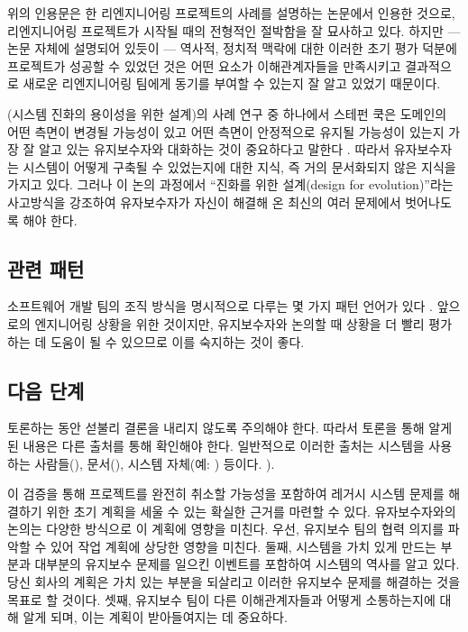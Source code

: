 \documentclass[a4paper,10pt,twoside]{book}
\begin{document}
위의 인용문은 한 리엔지니어링 프로젝트의 사례를 설명하는 논문에서 인용한 것으로, 리엔지니어링 프로젝트가 시작될 때의 전형적인 절박함을 잘 묘사하고 있다. 하지만 --- 논문 자체에 설명되어 있듯이 --- 역사적, 정치적 맥락에 대한 이러한 초기 평가 덕분에 프로젝트가 성공할 수 있었던 것은 어떤 요소가 이해관계자들을 만족시키고 결과적으로 새로운 리엔지니어링 팀에게 동기를 부여할 수 있는지 잘 알고 있었기 때문이다.

(시스템 진화의 용이성을 위한 설계)의 사례 연구 중 하나에서 스테펀 쿡은 도메인의 어떤 측면이 변경될 가능성이 있고 어떤 측면이 안정적으로 유지될 가능성이 있는지 가장 잘 알고 있는 유지보수자와 대화하는 것이 중요하다고 말한다 \cite{Cook01a}. 따라서 유자보수자는 시스템이 어떻게 구축될 수 있었는지에 대한 지식, 즉 거의 문서화되지 않은 지식을 가지고 있다. 그러나 이 논의 과정에서 ``진화를 위한 설계(design for evolution)''라는 사고방식을 강조하여 유자보수자가 자신이 해결해 온 최신의 여러 문제에서 벗어나도록 해야 한다.

\subsection*{관련 패턴}

소프트웨어 개발 팀의 조직 방식을 명시적으로 다루는 몇 가지 패턴 언어가 있다 \cite{Copl95d} \cite{Harri96a} \cite{Tayl00a} \cite{Beed00a}. 앞으로의 엔지니어링 상황을 위한 것이지만, 유지보수자와 논의할 때 상황을 더 빨리 평가하는 데 도움이 될 수 있으므로 이를 숙지하는 것이 좋다.

\subsection*{다음 단계}

토론하는 동안 섣불리 결론을 내리지 않도록 주의해야 한다. 따라서 토론을 통해 알게 된 내용은 다른 출처를 통해 확인해야 한다. 일반적으로 이러한 출처는 시스템을 사용하는 사람들(), 문서(), 시스템 자체(예: ) 등이다. ).

이 검증을 통해 프로젝트를 완전히 취소할 가능성을 포함하여 레거시 시스템 문제를 해결하기 위한 초기 계획을 세울 수 있는 확실한 근거를 마련할 수 있다. 유자보수자와의 논의는 다양한 방식으로 이 계획에 영향을 미친다. 우선, 유지보수 팀의 협력 의지를 파악할 수 있어 작업 계획에 상당한 영향을 미친다. 둘째, 시스템을 가치 있게 만드는 부분과 대부분의 유지보수 문제를 일으킨 이벤트를 포함하여 시스템의 역사를 알고 있다. 당신 회사의 계획은 가치 있는 부분을 되살리고 이러한 유지보수 문제를 해결하는 것을 목표로 할 것이다. 셋째, 유지보수 팀이 다른 이해관계자들과 어떻게 소통하는지에 대해 알게 되며, 이는 계획이 받아들여지는 데 중요하다.
\end{document}
